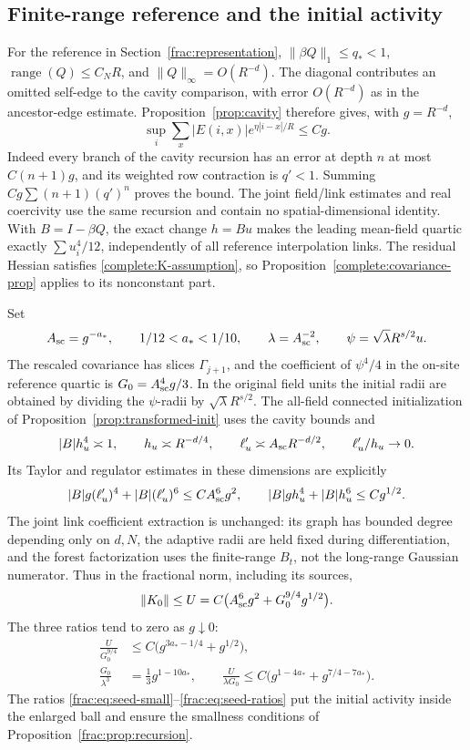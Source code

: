 \documentclass[11pt]{article}
\begin{document}
\subsection{Finite-range reference and the initial activity}
For the reference in Section~\ref{frac:representation},
\(\|\beta Q\|_1\le q_*<1\), \(\operatorname{range}(Q)\le C_NR\),
and \(\|Q\|_\infty=O(R^{-d})\). The diagonal contributes an
omitted self-edge to the cavity comparison, with error \(O(R^{-d})\)
as in the ancestor-edge estimate. Proposition~\ref{prop:cavity}
therefore gives, with \(g=R^{-d}\),
\[
 \sup_i\sum_x |E(i,x)|e^{\eta|i-x|/R}\le Cg.
\]
Indeed every branch of the cavity recursion has an error at depth
\(n\) at most \(C(n+1)g\), and its weighted row contraction is
\(q'<1\). Summing \(Cg\sum(n+1)(q')^n\) proves the bound.
The joint field/link estimates and real coercivity use the same
recursion and contain no spatial-dimensional identity. With
\(B=I-\beta Q\), the exact change \(h=Bu\) makes the leading
mean-field quartic exactly \(\sum u_i^4/12\), independently of
all reference interpolation links. The residual Hessian satisfies
\eqref{complete:K-assumption}, so Proposition~\ref{complete:covariance-prop}
applies to its nonconstant part.

Set
\[
 A_{\rm sc}=g^{-a_*},\qquad
 1/12<a_*<1/10,\qquad
 \lambda=A_{\rm sc}^{-2},\qquad
 \psi=\sqrt\lambda R^{s/2}u .
\]
The rescaled covariance has slices \(\Gamma_{j+1}\), and the
coefficient of \(\psi^4/4\) in the on-site reference quartic is
\(G_0=A_{\rm sc}^4g/3\). In the original field units the initial
radii are obtained by dividing the \(\psi\)-radii by
\(\sqrt\lambda R^{s/2}\). The all-field connected initialization
of Proposition~\ref{prop:transformed-init} uses the cavity bounds and
\[
 |B|h_u^4\asymp1,\qquad h_u\asymp R^{-d/4},\qquad
 \ell'_u\asymp A_{\rm sc}R^{-d/2},\qquad \ell'_u/h_u\to0.
\]
Its Taylor and regulator estimates in these dimensions are explicitly
\[
 |B|g(\ell'_u)^4+|B|(\ell'_u)^6
       \le C A_{\rm sc}^6g^2,
 \qquad |B|g h_u^4+|B|h_u^6\le Cg^{1/2}.
\]
The joint link coefficient extraction is unchanged: its graph has
bounded degree depending only on \(d,N\), the adaptive radii are held
fixed during differentiation, and the forest factorization uses the
finite-range \(B_t\), not the long-range Gaussian numerator. Thus
in the fractional norm, including its sources,
\[
 \|K_0\|\le U=C\bigl(A_{\rm sc}^6g^2+G_0^{9/4}g^{1/2}\bigr).
\]
The three ratios tend to zero as \(g\downarrow0\):
\begin{align}
 \frac{U}{G_0^{9/4}}
   &\le C\bigl(g^{3a_*-1/4}+g^{1/2}\bigr),
      \label{frac:eq:seed-small}\\
 \frac{G_0}{\lambda^3}
   &=\frac13g^{1-10a_*},\qquad
 \frac{U}{\lambda G_0}
   \le C\bigl(g^{1-4a_*}+g^{7/4-7a_*}\bigr).
      \label{frac:eq:seed-ratios}
\end{align}
The ratios \eqref{frac:eq:seed-small}--\eqref{frac:eq:seed-ratios}
put the initial activity inside the enlarged ball and ensure the
smallness conditions of Proposition~\ref{frac:prop:recursion}.
\end{document}
